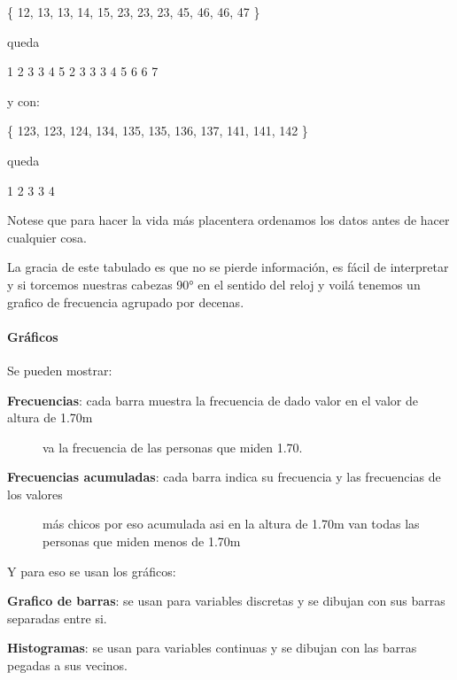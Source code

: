 \documentclass[letterpaper,10pt,openany,oneside]{sphinxmanual}
\begin{document}
\{ 12, 13, 13, 14, 15, 23, 23, 23, 45, 46, 46, 47 \}

queda

1 \textbar{} 2 3 3 4 5
2 \textbar{} 3 3 3
4 \textbar{} 5 6 6 7

y con:

\{ 123, 123, 124, 134, 135, 135, 136, 137, 141, 141, 142 \}

queda
\begin{description}
\item[{1 \textbar{} 2 \textbar{} 3 3 4}] \leavevmode
{}

\end{description}

Notese que para hacer la vida más placentera ordenamos los datos antes de hacer cualquier
cosa.

La gracia de este tabulado es que no se pierde información, es fácil de interpretar y si
torcemos nuestras cabezas 90° en el sentido del reloj y voilá tenemos un grafico de
frecuencia agrupado por decenas.


\paragraph{Gráficos}
\label{Estadistica_Descriptiva:id4}
Se pueden mostrar:
\begin{description}
\item[{\textbf{Frecuencias}: cada barra muestra la frecuencia de dado valor en el valor de altura de 1.70m}] \leavevmode
va la frecuencia de las personas que miden 1.70.

\item[{\textbf{Frecuencias acumuladas}: cada barra indica su frecuencia y las frecuencias de los valores}] \leavevmode
más chicos por eso acumulada asi en la altura de 1.70m van todas
las personas que miden menos de 1.70m

\end{description}

Y para eso se usan los gráficos:

\textbf{Grafico de barras}: se usan para variables discretas y se dibujan con sus barras separadas
entre si.

\textbf{Histogramas}: se usan para variables continuas y se dibujan con las barras pegadas a sus
vecinos.
\end{document}
